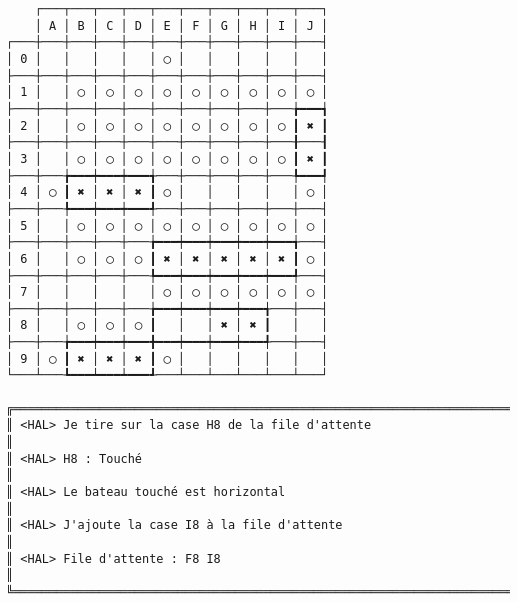 {\scriptsize
\begin{verbatim}
    ┌───┬───┬───┬───┬───┬───┬───┬───┬───┬───┐
    │ A │ B │ C │ D │ E │ F │ G │ H │ I │ J │
┌───┼───┼───┼───┼───┼───┼───┼───┼───┼───┼───┤
│ 0 │   │   │   │   │ ◯ │   │   │   │   │   │
├───┼───┼───┼───┼───┼───┼───┼───┼───┼───┼───┤
│ 1 │   │ ◯ │ ◯ │ ◯ │ ◯ │ ◯ │ ◯ │ ◯ │ ◯ │ ◯ │
├───┼───┼───┼───┼───┼───┼───┼───┼───┼───╆━━━┪
│ 2 │   │ ◯ │ ◯ │ ◯ │ ◯ │ ◯ │ ◯ │ ◯ │ ◯ ┃ ✖ ┃
├───┼───┼───┼───┼───┼───┼───┼───┼───┼───╂───┨
│ 3 │   │ ◯ │ ◯ │ ◯ │ ◯ │ ◯ │ ◯ │ ◯ │ ◯ ┃ ✖ ┃
├───┼───╆━━━┿━━━┿━━━╅───┼───┼───┼───┼───╄━━━┩
│ 4 │ ◯ ┃ ✖ │ ✖ │ ✖ ┃ ◯ │   │   │   │   │ ◯ │
├───┼───╄━━━┿━━━┿━━━╃───┼───┼───┼───┼───┼───┤
│ 5 │   │ ◯ │ ◯ │ ◯ │ ◯ │ ◯ │ ◯ │ ◯ │ ◯ │ ◯ │
├───┼───┼───┼───┼───╆━━━┿━━━┿━━━┿━━━┿━━━╅───┤
│ 6 │   │ ◯ │ ◯ │ ◯ ┃ ✖ │ ✖ │ ✖ │ ✖ │ ✖ ┃ ◯ │
├───┼───┼───┼───┼───╄━━━┿━━━┿━━━┿━━━┿━━━╃───┤
│ 7 │   │   │   │   │ ◯ │ ◯ │ ◯ │ ◯ │ ◯ │ ◯ │
├───┼───┼───┼───┼───╆━━━┿━━━┿━━━┿━━━╅───┼───┤
│ 8 │   │ ◯ │ ◯ │ ◯ ┃   │   │ ✖ │ ✖ ┃   │   │
├───┼───╆━━━┿━━━┿━━━╋━━━┿━━━┿━━━┿━━━╃───┼───┤
│ 9 │ ◯ ┃ ✖ │ ✖ │ ✖ ┃ ◯ │   │   │   │   │   │
└───┴───┺━━━┷━━━┷━━━┹───┴───┴───┴───┴───┴───┘

╔══════════════════════════════════════════════════════════════════════════════════════════════════╗
║ <HAL> Je tire sur la case H8 de la file d'attente                                                ║
║ <HAL> H8 : Touché                                                                                ║
║ <HAL> Le bateau touché est horizontal                                                            ║
║ <HAL> J'ajoute la case I8 à la file d'attente                                                    ║
║ <HAL> File d'attente : F8 I8                                                                     ║
╚══════════════════════════════════════════════════════════════════════════════════════════════════╝
\end{verbatim}}
\newpage

